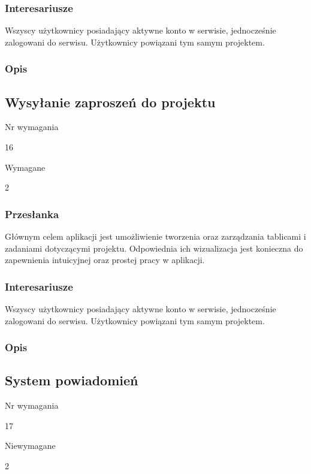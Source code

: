\documentclass[eng,printmode]{mgr}
\begin{document}
\subsubsection{Interesariusze}
Wszyscy użytkownicy posiadający aktywne konto w serwisie, jednocześnie zalogowani do serwisu. Użytkownicy powiązani tym samym projektem.

\subsubsection{Opis}
\newpage

\subsection{Wysyłanie zaproszeń do projektu}
\begin{labeling}{Nr wymagania}
\item [Nr wymagania:] 16
\item [Priorytet:] Wymagane
\item [Powiązania:] 2
\end{labeling}

\subsubsection{Przesłanka}
Głównym celem aplikacji jest umożliwienie tworzenia oraz zarządzania tablicami i zadaniami dotyczącymi projektu. Odpowiednia ich wizualizacja jest konieczna do zapewnienia intuicyjnej oraz prostej pracy w aplikacji.

\subsubsection{Interesariusze}
Wszyscy użytkownicy posiadający aktywne konto w serwisie, jednocześnie zalogowani do serwisu. Użytkownicy powiązani tym samym projektem.

\subsubsection{Opis}
\newpage

\subsection{System powiadomień}
\begin{labeling}{Nr wymagania}
\item [Nr wymagania:] 17
\item [Priorytet:] Niewymagane
\item [Powiązania:] 2
\end{labeling}
\end{document}
